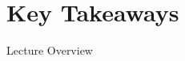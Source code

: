 \section{Key Takeaways}

\begin{frame}
\titlepage
\end{frame}

\begin{frame}{Lecture Overview}
\tableofcontents
\end{frame}
